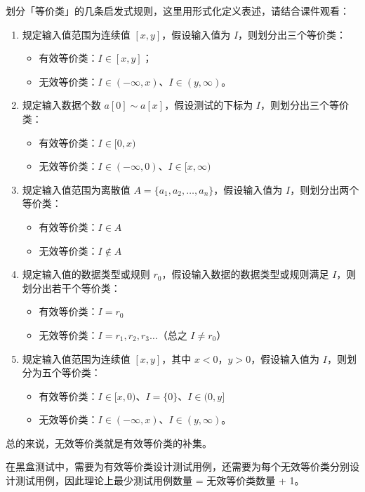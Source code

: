 \documentclass[UTF8]{ctexart}
\begin{document}
划分「等价类」的几条启发式规则，这里用形式化定义表述，请结合课件观看：
\begin{enumerate}
    \item 规定输入值范围为连续值 $[x,y]$，假设输入值为 $I$，则划分出三个等价类：
    \begin{itemize}
        \item 有效等价类：$I\in[x,y]$；
        \item 无效等价类：$I\in(-\infty,x)$、$I\in(y,\infty)$。
    \end{itemize}
    \item 规定输入数据个数 $a[0]\sim a[x]$，假设测试的下标为 $I$，则划分出三个等价类：
    \begin{itemize}
        \item 有效等价类：$I\in [0,x)$
        \item 无效等价类：$I\in (-\infty,0)$、$I\in [x,\infty)$
    \end{itemize}
    \item 规定输入值范围为离散值 $A=\{a_1,a_2,\dots, a_n\}$，假设输入值为 $I$，则划分出两个等价类：
    \begin{itemize}
        \item 有效等价类：$I\in A$
        \item 无效等价类：$I\notin A$
    \end{itemize}
    \item 规定输入值的数据类型或规则 $r_0$，假设输入数据的数据类型或规则满足 $I$，则划分出若干个等价类：
    \begin{itemize}
        \item 有效等价类：$I = r_0$
        \item 无效等价类：$I = r_1, r_2, r_3\dots$（总之 $I\ne r_0$）
    \end{itemize}
    \item 规定输入值范围为连续值 $[x,y]$，其中 $x<0$，$y>0$，假设输入值为 $I$，则划分为五个等价类：
    \begin{itemize}
        \item 有效等价类：$I\in [x,0)$、$I = \{0\}$、$I \in (0,y]$
        \item 无效等价类：$I\in(-\infty,x)$、$I\in(y,\infty)$。
    \end{itemize}
\end{enumerate}
总的来说，无效等价类就是有效等价类的补集。

在黑盒测试中，需要为有效等价类设计测试用例，还需要为每个无效等价类分别设计测试用例，因此理论上最少测试用例数量 = 无效等价类数量 + 1。
\end{document}
